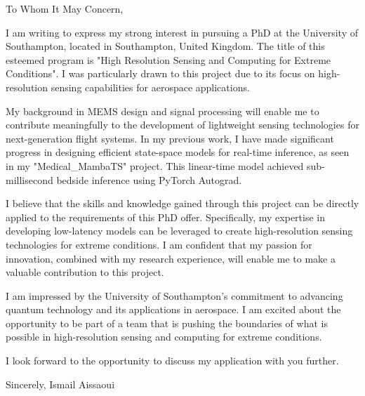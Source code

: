 \documentclass{letter}
\begin{document}
\opening{\noindent To Whom It May Concern,}

I am writing to express my strong interest in pursuing a PhD at the University of Southampton, located in Southampton, United Kingdom. The title of this esteemed program is "High Resolution Sensing and Computing for Extreme Conditions". I was particularly drawn to this project due to its focus on high-resolution sensing capabilities for aerospace applications.

My background in MEMS design and signal processing will enable me to contribute meaningfully to the development of lightweight sensing technologies for next-generation flight systems. In my previous work, I have made significant progress in designing efficient state-space models for real-time inference, as seen in my "Medical_MambaTS" project. This linear-time model achieved sub-millisecond bedside inference using PyTorch Autograd.

I believe that the skills and knowledge gained through this project can be directly applied to the requirements of this PhD offer. Specifically, my expertise in developing low-latency models can be leveraged to create high-resolution sensing technologies for extreme conditions. I am confident that my passion for innovation, combined with my research experience, will enable me to make a valuable contribution to this project.

I am impressed by the University of Southampton's commitment to advancing quantum technology and its applications in aerospace. I am excited about the opportunity to be part of a team that is pushing the boundaries of what is possible in high-resolution sensing and computing for extreme conditions.

I look forward to the opportunity to discuss my application with you further.

Sincerely,
Ismail Aissaoui

\closing{}
\end{document}
